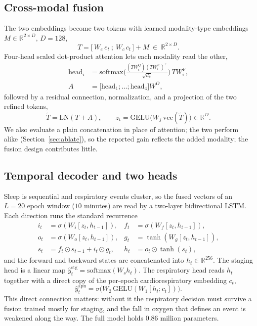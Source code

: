 \documentclass[journal]{IEEEtran}
\begin{document}
\subsection{Cross-modal fusion}
The two embeddings become two tokens with learned modality-type embeddings
$M\in\mathbb{R}^{2\times D}$, $D=128$,
\begin{equation}
T=\big[\,W_e\,e_t\ ;\ W_c\,c_t\,\big]+M\ \in\ \mathbb{R}^{2\times D}.
\end{equation}
Four-head scaled dot-product attention lets each modality read the other,
\begin{equation}
\begin{aligned}
\mathrm{head}_i&=\mathrm{softmax}\!\Big(\tfrac{(TW^Q_i)(TW^K_i)^{\!\top}}{\sqrt{d_k}}\Big)\,TW^V_i, \\
A&=\big[\mathrm{head}_1;\dots;\mathrm{head}_4\big]W^O,
\end{aligned}
\end{equation}
followed by a residual connection, normalization, and a projection of the two refined tokens,
\begin{equation}
\tilde T=\mathrm{LN}(T+A),\qquad z_t=\mathrm{GELU}\!\big(W_f\,\mathrm{vec}(\tilde T)\big)\in\mathbb{R}^{D}.
\end{equation}
We also evaluate a plain concatenation in place of attention; the two perform alike
(Section~\ref{sec:ablate}), so the reported gain reflects the added modality; the fusion design
contributes little.

\subsection{Temporal decoder and two heads}
Sleep is sequential and respiratory events cluster, so the fused vectors of an $L=20$ epoch
window ($10$ minutes) are read by a two-layer bidirectional LSTM. Each direction runs the
standard recurrence
\begin{align}
i_t&=\sigma(W_i[z_t,h_{t-1}]), & f_t&=\sigma(W_f[z_t,h_{t-1}]),\nonumber\\
o_t&=\sigma(W_o[z_t,h_{t-1}]), & g_t&=\tanh(W_g[z_t,h_{t-1}]),\\
s_t&=f_t\odot s_{t-1}+i_t\odot g_t, & h_t&=o_t\odot\tanh(s_t),\nonumber
\end{align}
and the forward and backward states are concatenated into $h_t\in\mathbb{R}^{256}$. The
staging head is a linear map $\hat y^{\mathrm{stg}}_t=\mathrm{softmax}(W_s h_t)$. The
respiratory head reads $h_t$ together with a direct copy of the per-epoch cardiorespiratory
embedding $c_t$,
\begin{equation}
\hat y^{\mathrm{apn}}_t=\sigma\!\big(W_2\,\mathrm{GELU}(W_1[h_t;c_t])\big).
\end{equation}
This direct connection matters: without it the respiratory decision must survive a fusion
trained mostly for staging, and the fall in oxygen that defines an event is weakened along the
way. The full model holds $0.86$ million parameters.
\end{document}
